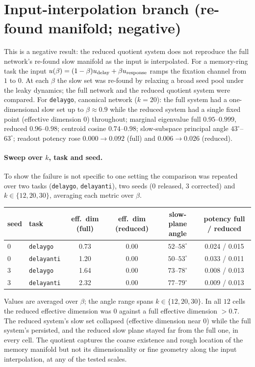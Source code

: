 \documentclass[11pt]{article}
\begin{document}
\section{Input-interpolation branch (re-found manifold; negative)}
\label{sec:branch}
This is a negative result: the reduced quotient system does not reproduce the full network's
re-found slow manifold as the input is interpolated. For a memory-ring task the input
$u(\beta)=(1-\beta)u_{\rm delay}+\beta u_{\rm response}$ ramps the fixation channel from $1$ to
$0$. At each $\beta$ the slow set was re-found by relaxing a broad seed pool under the leaky
dynamics; the full network and the reduced quotient system were compared. For \texttt{delaygo},
canonical network ($k=20$): the full system had a one-dimensional slow set up to
$\beta\approx0.9$ while the reduced system had a single fixed point (effective dimension $0$)
throughout; marginal eigenvalue full $0.95$--$0.999$, reduced $0.96$--$0.98$; centroid cosine
$0.74$--$0.98$; slow-subspace principal angle $43^{\circ}$--$63^{\circ}$; readout potency rose
$0.000\to0.092$ (full) and $0.006\to0.026$ (reduced).

\paragraph{Sweep over $k$, task and seed.} To show the failure is not specific to one setting the
comparison was repeated over two tasks (\texttt{delaygo}, \texttt{delayanti}), two seeds ($0$
released, $3$ corrected) and $k\in\{12,20,30\}$, averaging each metric over $\beta$.
\begin{center}\small
\begin{tabular}{llcccc}
\toprule
seed & task & eff.\ dim (full) & eff.\ dim (reduced) & slow-plane angle & potency full / reduced \\
\midrule
0 & \texttt{delaygo}   & 0.73 & 0.00 & $52$--$58^{\circ}$ & 0.024 / 0.015 \\
0 & \texttt{delayanti} & 1.20 & 0.00 & $50$--$53^{\circ}$ & 0.033 / 0.011 \\
3 & \texttt{delaygo}   & 1.64 & 0.00 & $73$--$78^{\circ}$ & 0.008 / 0.013 \\
3 & \texttt{delayanti} & 2.32 & 0.00 & $77$--$79^{\circ}$ & 0.009 / 0.013 \\
\bottomrule
\end{tabular}
\end{center}
Values are averaged over $\beta$; the angle range spans $k\in\{12,20,30\}$. In all $12$ cells the
reduced effective dimension was $0$ against a full effective dimension $>0.7$.
The reduced system's slow set collapsed (effective dimension near $0$) while the full system's
persisted, and the reduced slow plane stayed far from the full one, in every cell. The quotient
captures the coarse existence and rough location of the memory manifold but not its dimensionality
or fine geometry along the input interpolation, at any of the tested scales.
\end{document}
